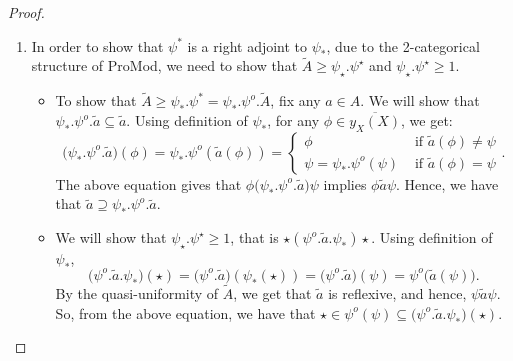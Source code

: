 \documentclass[a4paper]{article}
\theoremstyle{definition}
\begin{document}
\begin{proof}
\begin{enumerate}[label=(\roman*)]
\begin{enumerate}[label=\Roman*]
					\item In order to show that
						$\psi^*$ is a right adjoint to $\psi_*$,
						due to the 2-categorical structure of ProMod,
						we need to show that
						$\tilde{A} \geq \psi_\star.\psi^\star $ and
						$\psi_\star.\psi^\star \geq 1$.
						\begin{itemize}
	\item To show that $\tilde{A}\geq \psi_*.\psi^*=\psi_*.\psi^o.\tilde{A} $,
								fix any $a\in A$. We will show that $\psi_*.\psi^o.\tilde{a} \subseteq \tilde{a}$.
								Using definition of $\psi_*$, for any $\phi \in \overline{y_X^{}(X)}$, we get:
								\[\big(\psi_*.\psi^o.\tilde{a}\big)(\phi)=
									\psi_*.\psi^o(\tilde{a}(\phi))= \begin{cases}
										\phi &\text{ if }\tilde{a} (\phi)\neq \psi \\
										\psi=\psi_*.\psi^o(\psi) &\text{ if } \tilde{a} (\phi)=\psi
									\end{cases}.\]
									The above equation gives that $\phi\big(\psi_*.\psi^o.\tilde{a}\big)\psi$ implies
									$\phi \tilde{a} \psi$.
									Hence,
									we have that
									$\tilde{a}\supseteq
									\psi_*.\psi^o.\tilde{a} $.
								\item We will show that $\psi_\star.\psi^\star \geq 1$, that is
									$\star(\psi^o.\tilde{a} .\psi_*)\star$. Using definition of $\psi_*$,
									\[\big(\psi^o.\tilde{a} .\psi_*\big)(\star)=\big(\psi^o.\tilde{a}\big) (\psi_*(\star))
									= \big( \psi^o.\tilde{a} \big) (\psi)=\psi^o \big( \tilde{a}(\psi)  \big). \]
									By the quasi-uniformity of $\tilde{A}$, we get that $\tilde{a}$ is reflexive, and hence,
									$\psi \tilde{a} \psi$. So, from the above equation, we have that
									$\star \in \psi^o(\psi) \subseteq \big(\psi^o.\tilde{a} .\psi_*\big)(\star) $.
							\end{itemize}
					\end{enumerate}


\end{enumerate}
\end{proof}
\end{document}
